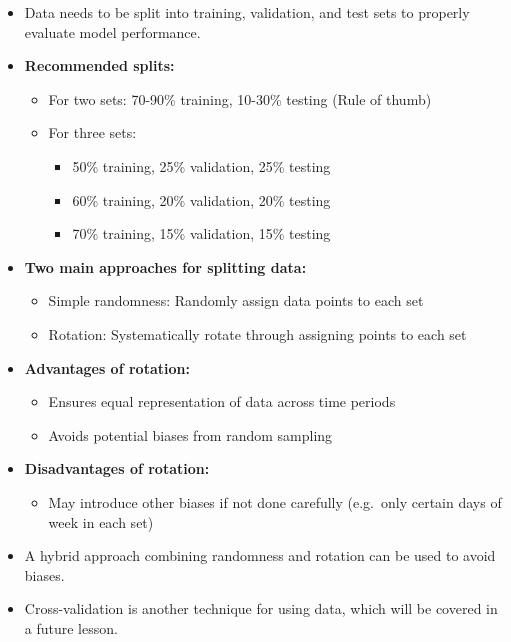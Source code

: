 \documentclass[
]{book}
\providecommand{\tightlist}{%
  \setlength{\itemsep}{0pt}\setlength{\parskip}{0pt}}
\begin{document}
\begin{itemize}
\tightlist
\item
  Data needs to be split into training, validation, and test sets to properly evaluate model performance.
\item
  \textbf{Recommended splits:}

  \begin{itemize}
  \tightlist
  \item
    For two sets: 70-90\% training, 10-30\% testing (Rule of thumb)
  \item
    For three sets:

    \begin{itemize}
    \tightlist
    \item
      50\% training, 25\% validation, 25\% testing
    \item
      60\% training, 20\% validation, 20\% testing
    \item
      70\% training, 15\% validation, 15\% testing
    \end{itemize}
  \end{itemize}
\item
  \textbf{Two main approaches for splitting data:}

  \begin{itemize}
  \tightlist
  \item
    Simple randomness: Randomly assign data points to each set
  \item
    Rotation: Systematically rotate through assigning points to each set
  \end{itemize}
\item
  \textbf{Advantages of rotation:}

  \begin{itemize}
  \tightlist
  \item
    Ensures equal representation of data across time periods
  \item
    Avoids potential biases from random sampling
  \end{itemize}
\item
  \textbf{Disadvantages of rotation:}

  \begin{itemize}
  \tightlist
  \item
    May introduce other biases if not done carefully (e.g.~only certain days of week in each set)
  \end{itemize}
\item
  A hybrid approach combining randomness and rotation can be used to avoid biases.
\item
  Cross-validation is another technique for using data, which will be covered in a future lesson.
\end{itemize}
\end{document}
